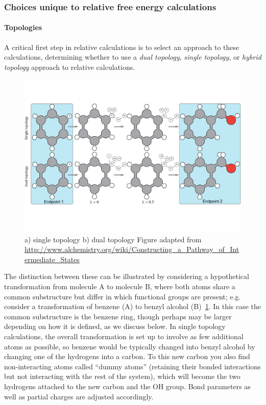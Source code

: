 \documentclass[9pt,bestpractices]{livecoms}
\begin{document}
\subsubsection*{Choices unique to relative free energy calculations}

\paragraph{Topologies} A critical first step in relative calculations is to select an approach to these calculations, determining whether to use a \emph{dual topology}, \emph{single topology}, or \emph{hybrid topology} approach to relative calculations.
\begin{figure}
    \includegraphics[width=0.95\linewidth]{paper/figures/fig4/topologies.pdf}
    \caption{a) single topology b) dual topology Figure adapted from \url{http://www.alchemistry.org/wiki/Constructing_a_Pathway_of_Intermediate_States}}
    \label{fig:topology}
\end{figure} 
The distinction between these can be illustrated by considering a hypothetical transformation from molecule A to molecule B, where both atoms share a common substructure but differ in which functional groups are present; e.g. consider a transformation of benzene (A) to benzyl alcohol (B)~\ref{fig:topology}.
In this case the common substructure is the benzene ring, though perhaps may be larger depending on how it is defined, as we discuss below.
In single topology calculations, the overall transformation is set up to involve as few additional atoms as possible, so benzene would be typically changed into benzyl alcohol by changing one of the hydrogens into a carbon. To this new carbon you also find non-interacting atoms called ``dummy atoms'' (retaining their bonded interactions but not interacting with the rest of the system), which will become the two hydrogens attached to the new carbon and the OH group. Bond parameters as well as partial charges are adjusted accordingly. 
\end{document}
